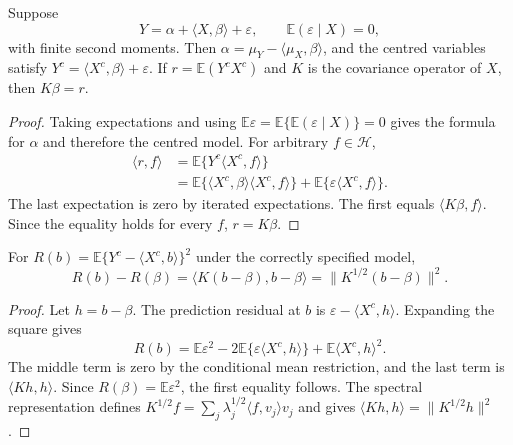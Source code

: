 \begin{proposition}
\label{prop:app-normal-equation}
Suppose
\[
 Y=\alpha+\langle X,\beta\rangle+\varepsilon,
 \qquad \mathbb E(\varepsilon\mid X)=0,
\]
with finite second moments.  Then
$\alpha=\mu_Y-\langle\mu_X,\beta\rangle$, and the centred variables satisfy
$Y^c=\langle X^c,\beta\rangle+\varepsilon$.  If
$r=\mathbb E(Y^cX^c)$ and $K$ is the covariance operator of $X$, then
$K\beta=r$.
\end{proposition}

\begin{proof}
Taking expectations and using
$\mathbb E\varepsilon=\mathbb E\{\mathbb E(\varepsilon\mid X)\}=0$ gives
the formula for $\alpha$ and therefore the centred model.  For arbitrary
$f\in\mathcal H$,
\begin{align*}
 \langle r,f\rangle
 &=\mathbb E\{Y^c\langle X^c,f\rangle\} \\
 &=\mathbb E\{\langle X^c,\beta\rangle\langle X^c,f\rangle\}
   +\mathbb E\{\varepsilon\langle X^c,f\rangle\}.
\end{align*}
The last expectation is zero by iterated expectations.  The first equals
$\langle K\beta,f\rangle$.  Since the equality holds for every $f$,
$r=K\beta$.
\end{proof}

\begin{proposition}
\label{prop:app-risk-identity}
For $R(b)=\mathbb E\{Y^c-\langle X^c,b\rangle\}^2$ under the correctly
specified model,
\[
 R(b)-R(\beta)
 =\langle K(b-\beta),b-\beta\rangle
 =\|K^{1/2}(b-\beta)\|^2.
\]
\end{proposition}

\begin{proof}
Let $h=b-\beta$.  The prediction residual at $b$ is
$\varepsilon-\langle X^c,h\rangle$.  Expanding the square gives
\[
 R(b)=\mathbb E\varepsilon^2
 -2\mathbb E\{\varepsilon\langle X^c,h\rangle\}
 +\mathbb E\langle X^c,h\rangle^2.
\]
The middle term is zero by the conditional mean restriction, and the last
term is $\langle Kh,h\rangle$.  Since $R(\beta)=\mathbb E\varepsilon^2$, the
first equality follows.  The spectral representation defines
$K^{1/2}f=\sum_j\lambda_j^{1/2}\langle f,v_j\rangle v_j$ and gives
$\langle Kh,h\rangle=\|K^{1/2}h\|^2$.
\end{proof}

